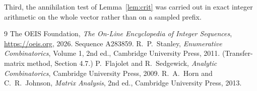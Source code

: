\documentclass[11pt,a4paper]{article}
\theoremstyle{plain}
\theoremstyle{definition}
\begin{document}
Third, the annihilation test of Lemma~\ref{lem:crit} was carried out in exact integer
arithmetic on the whole vector rather than on a sampled prefix.

\begin{thebibliography}{9}
 The OEIS Foundation, \emph{The On-Line Encyclopedia of Integer
Sequences}, \url{https://oeis.org}, 2026. Sequence A283859.
 R.~P.~Stanley, \emph{Enumerative Combinatorics}, Volume 1, 2nd ed.,
Cambridge University Press, 2011. (Transfer-matrix method, Section 4.7.)
 P.~Flajolet and R.~Sedgewick, \emph{Analytic Combinatorics}, Cambridge
University Press, 2009.
 R.~A.~Horn and C.~R.~Johnson, \emph{Matrix Analysis}, 2nd ed., Cambridge
University Press, 2013.
\end{thebibliography}
\end{document}
